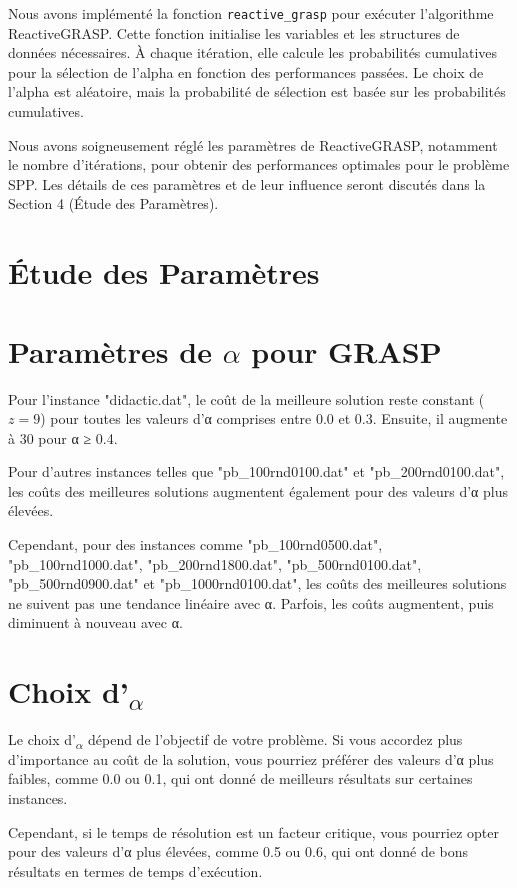 \documentclass[12pt]{article}
\begin{document}
Nous avons implémenté la fonction \texttt{reactive\_grasp} pour exécuter l'algorithme ReactiveGRASP. Cette fonction initialise les variables et les structures de données nécessaires. À chaque itération, elle calcule les probabilités cumulatives pour la sélection de l'alpha en fonction des performances passées. Le choix de l'alpha est aléatoire, mais la probabilité de sélection est basée sur les probabilités cumulatives.


Nous avons soigneusement réglé les paramètres de ReactiveGRASP, notamment le nombre d'itérations, pour obtenir des performances optimales pour le problème SPP. Les détails de ces paramètres et de leur influence seront discutés dans la Section 4 (Étude des Paramètres).

\section{Étude des Paramètres}
\section*{Paramètres de \(\alpha\) pour GRASP}

Pour l'instance "didactic.dat", le coût de la meilleure solution reste constant ($z = 9$) pour toutes les valeurs d'α comprises entre 0.0 et 0.3. Ensuite, il augmente à 30 pour α ≥ 0.4.

Pour d'autres instances telles que "pb\_100rnd0100.dat" et "pb\_200rnd0100.dat", les coûts des meilleures solutions augmentent également pour des valeurs d'α plus élevées.

Cependant, pour des instances comme "pb\_100rnd0500.dat", "pb\_100rnd1000.dat", "pb\_200rnd1800.dat", "pb\_500rnd0100.dat", "pb\_500rnd0900.dat" et "pb\_1000rnd0100.dat", les coûts des meilleures solutions ne suivent pas une tendance linéaire avec α. Parfois, les coûts augmentent, puis diminuent à nouveau avec α.


\section{Choix d'\textsubscript{\(\alpha\)}}

Le choix d'\textsubscript{\(\alpha\)} dépend de l'objectif de votre problème. Si vous accordez plus d'importance au coût de la solution, vous pourriez préférer des valeurs d'α plus faibles, comme 0.0 ou 0.1, qui ont donné de meilleurs résultats sur certaines instances.

Cependant, si le temps de résolution est un facteur critique, vous pourriez opter pour des valeurs d'α plus élevées, comme 0.5 ou 0.6, qui ont donné de bons résultats en termes de temps d'exécution.
\end{document}
